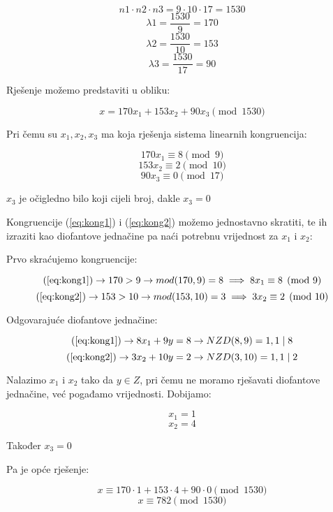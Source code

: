 \documentclass[12pt]{article}
\begin{document}
$$n1 \cdot n2 \cdot n3 = 9 \cdot 10 \cdot 17 = 1530$$\vspace{1mm}
$$\lambda 1 = \frac{1530}{9} = 170$$\vspace{1mm}
$$\lambda 2 = \frac{1530}{10} = 153$$\vspace{1mm}
$$\lambda 3 = \frac{1530}{17} = 90$$\vspace{1mm}

Rješenje možemo predstaviti u obliku:

$$x = 170x_{1} + 153x_{2} + 90x_{3} \pmod{1530}$$\vspace{1mm}

Pri čemu su $x_{1}, x_{2}, x_{3}$ ma koja rješenja sistema linearnih kongruencija:

\[
170x_{1} \equiv 8 \pmod{9} \label{eq:kong1} \tag{A}
\]
\[
153x_{2} \equiv 2 \pmod{10} \label{eq:kong2} \tag{B}
\]
$$90x_{3} \equiv 0 \pmod{17}$$

\begin{center}
$x_{3}$ je očigledno bilo koji cijeli broj, dakle $x_{3} = 0$
\end{center}\vspace{1mm}

Kongruencije (\ref{eq:kong1}) i (\ref{eq:kong2}) možemo jednostavno skratiti, te ih izraziti kao diofantove jednačine pa naći potrebnu vrijednost za $x_{1}$ i $x_{2}$:

Prvo skraćujemo kongruencije:

$$(\ref{eq:kong1}) \to 170 > 9 \to mod(170, 9) = 8 \implies 8x_{1} \equiv 8 \pmod{9}$$
$$(\ref{eq:kong2}) \to 153 > 10 \to mod(153, 10) = 3 \implies 3x_{2} \equiv 2 \pmod{10}$$\vspace{1mm}

Odgovarajuće diofantove jednačine:

$$(\ref{eq:kong1}) \to 8x_{1} + 9y = 8 \to NZD(8, 9) = 1, 1 \mid 8$$
$$(\ref{eq:kong2}) \to 3x_{2} + 10y = 2 \to NZD(3, 10) = 1, 1 \mid 2$$\vspace{1mm}

Nalazimo $x_{1}$ i $x_{2}$ tako da $y \in Z$, pri čemu ne moramo rješavati diofantove jednačine, već pogađamo vrijednosti. Dobijamo:

$$x_{1} = 1$$
$$x_{2} = 4$$
\begin{center}
Također $x_{3} = 0$
\end{center}

Pa je opće rješenje:

$$x \equiv 170 \cdot 1 + 153 \cdot 4 + 90 \cdot 0 \pmod{1530}$$
$$x \equiv 782 \pmod{1530}$$
\end{document}
